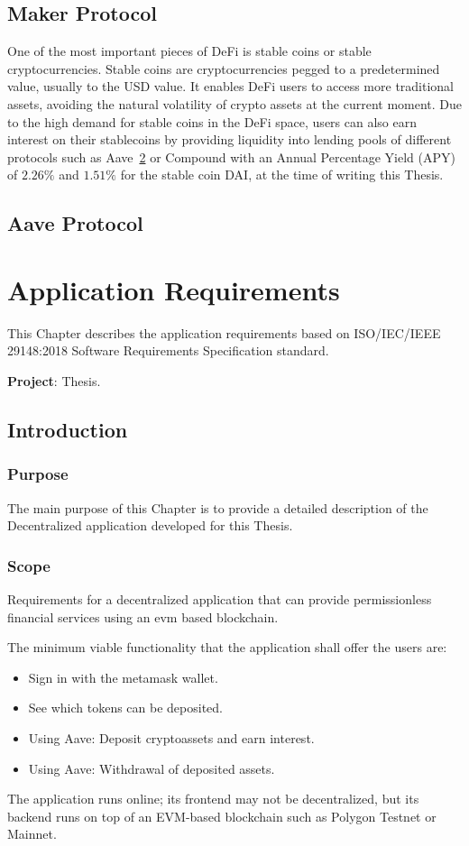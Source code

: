 \documentclass[11pt,a4paper]{report}
\begin{document}
\section{Maker Protocol}\label{sec:maker}
One of the most important pieces of DeFi is stable coins or stable cryptocurrencies. Stable coins are cryptocurrencies pegged to a predetermined value, usually to the USD value. It enables DeFi users to access more traditional assets, avoiding the natural volatility of crypto assets at the current moment. Due to the high demand for stable coins in the DeFi space, users can also earn interest on their stablecoins by providing liquidity into lending pools of different protocols such as Aave~\ref{sec:aave} or Compound\cite{compound} with an Annual Percentage Yield (APY) of $2.26\%$ and $1.51\%$  for the stable coin DAI, at the time of writing this Thesis.



\section{Aave Protocol}\label{sec:aave}



\chapter{Application Requirements} \label{ch:appreq}
This Chapter describes the application requirements based on ISO/IEC/IEEE 29148:2018\cite{iso} Software Requirements Specification standard.

\textbf{Project}: Thesis.
\section{Introduction}
\subsection{Purpose}
The main purpose of this Chapter is to provide a detailed description of the Decentralized application developed for this Thesis. 
\subsection{Scope}
Requirements for a decentralized application that can provide
permissionless financial services using an evm based blockchain.

The minimum viable functionality that the application shall offer the users are:
\begin{itemize}
	\item Sign in with the metamask wallet.
	\item See which tokens can be deposited.
	\item Using Aave: Deposit cryptoassets and earn interest. 
	\item Using Aave: Withdrawal of deposited assets.
\end{itemize}
The application runs online; its frontend may not be decentralized, but its backend runs on top of an EVM-based blockchain such as Polygon Testnet or Mainnet.
\end{document}
